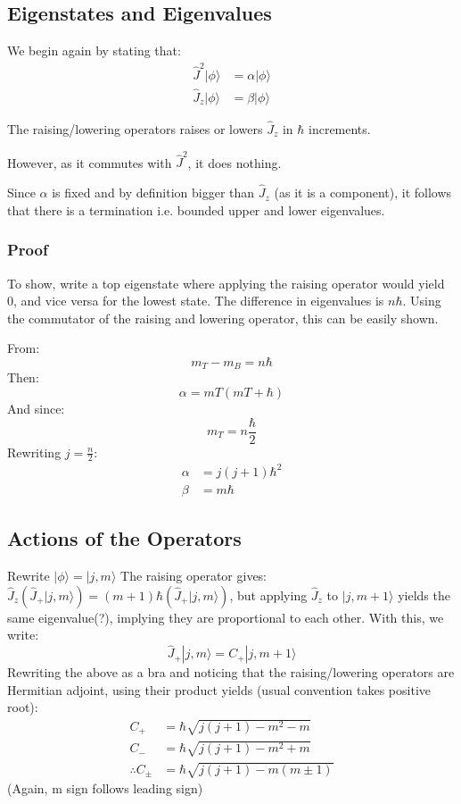 \documentclass[11pt]{article}
\begin{document}
\subsection{Eigenstates and Eigenvalues}
\label{sec:org040af85}

We begin again by stating that:
\begin{align*}
\hat{J}^2 |\phi\rangle &= \alpha |\phi\rangle\\
\hat{J}_z |\phi\rangle &= \beta |\phi\rangle
\end{align*}

The raising/lowering operators raises or lowers \(\hat{J}_z\) in \(\hbar\)
increments.

However, as it commutes with \(\hat{J}^2\), it does nothing. 

Since \(\alpha\) is fixed and by definition bigger than \(\hat{J}_z\) (as
it is a component), it follows that there is a termination
i.e. bounded upper and lower eigenvalues.

\subsubsection{Proof}
\label{sec:orgdc42ac6}

To show, write a top eigenstate where applying the raising operator
would yield 0, and vice versa for the lowest state. The difference in
eigenvalues is \(n\hbar\). Using the commutator of the raising and
lowering operator, this can be easily shown.

From:
\[m_T - m_B = n\hbar\]
Then:
\[\alpha = mT(mT +\hbar)\]
And since:
\[ m_T = n\frac{\hbar}{2}\]
Rewriting \(j = \frac{n}{2}\):
\begin{align*}
\alpha &= j(j+1)\hbar^2\\
\beta &= m\hbar
\end{align*}

\subsection{Actions of the Operators}
\label{sec:org4a18614}

Rewrite \(|\phi\rangle = |j, m\rangle\) The raising operator gives:
\(\hat{J}_z\left(\hat{J}_+|j,m\rangle\right) =
(m+1)\hbar\left(\hat{J}_+|j,m\rangle\right)\), but applying \(\hat{J}_z\)
to \(|j,m+1\rangle\) yields the same eigenvalue(?), implying they are
proportional to each other. With this, we write: \[
\hat{J}_+ |j,m\rangle = C_+ |j, m+1\rangle \] Rewriting the above as a
bra and noticing that the raising/lowering operators are Hermitian
adjoint, using their product yields (usual convention takes positive root):
\begin{align*}
C_+ &= \hbar\sqrt{j(j+1)-m^2-m}\\
C_- &= \hbar\sqrt{j(j+1)-m^2+m}\\
\therefore C_\pm &= \hbar\sqrt{j(j+1)-m(m\pm 1)}
\end{align*}
(Again, m sign follows leading sign)
\end{document}
